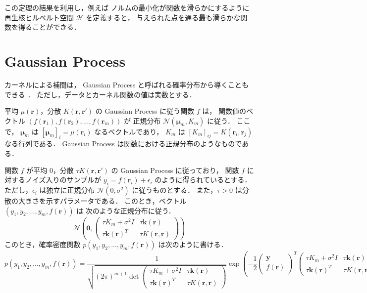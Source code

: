 この定理の結果を利用し，例えば
ノルムの最小化が関数を滑らかにするように
再生核ヒルベルト空間 $\mathcal{H}$ を定義すると，
与えられた点を通る最も滑らかな関数を得ることができる．

\section{Gaussian Process}\label{sec:regularization_kernel_gaussian-process}

カーネルによる補間は，
Gaussian Process と呼ばれる確率分布から導くこともできる
\cite{Brochu2010}．
ただし，データとカーネル関数の値は実数とする．

平均 $\mu(\bm{r})$，分散 $K(\bm{r}, \bm{r}')$ の Gaussian Process に従う関数 $f$ は，
関数値のベクトル $(f(\bm{r}_1), f(\bm{r}_2), \ldots, f(\bm{r}_m))$ が
正規分布 $\mathcal{N}(\bm{\mu}_m, K_m)$ に従う．
ここで，
$\bm{\mu}_m$ は $[\bm{\mu}_m]_i = \mu(\bm{r}_i)$ なるベクトルであり，
$K_m$ は $[K_m]_{ij} = K(\bm{r}_i, \bm{r}_j)$ なる行列である．
Gaussian Process は関数における正規分布のようなものである．

関数 $f$ が平均 $0$，分散 $\tau K(\bm{r}, \bm{r}')$ の Gaussian Process に従っており，
関数 $f$ に対するノイズ入りのサンプルが $y_i = f(\bm{r}_i) + \epsilon_i$ のように得られているとする．
ただし，$\epsilon_i$ は独立に正規分布 $\mathcal{N}(0, \sigma^2)$ に従うものとする．
また，$\tau > 0$ は分散の大きさを示すパラメータである．
このとき，ベクトル $(y_1, y_2, \ldots, y_m, f(\bm{r}))$ は
次のような正規分布に従う．
\begin{equation}
    \mathcal{N}\left(\bm{0},
    \begin{pmatrix}
        \tau K_m + \sigma^2 I & \tau \bm{k}(\bm{r})    \\
        \tau \bm{k}(\bm{r})^T & \tau K(\bm{r}, \bm{r})
    \end{pmatrix}
    \right)
\end{equation}
このとき，確率密度関数 $p(y_1, y_2, \ldots, y_m, f(\bm{r}))$ は次のように書ける．
\begin{equation}
    p(y_1, y_2, \ldots, y_m, f(\bm{r}))
    = \frac{1}{\sqrt{(2\pi)^{m+1} \det{
                \begin{pmatrix}
                    \tau K_m + \sigma^2 I & \tau \bm{k}(\bm{r})    \\
                    \tau \bm{k}(\bm{r})^T & \tau K(\bm{r}, \bm{r})
                \end{pmatrix}
            }}}
    \exp\left(-\frac{1}{2}
    \begin{pmatrix}
        \bm{y} \\ f(\bm{r})
    \end{pmatrix}^T
    \begin{pmatrix}
        \tau K_m + \sigma^2 I & \tau \bm{k}(\bm{r})    \\
        \tau \bm{k}(\bm{r})^T & \tau K(\bm{r}, \bm{r})
    \end{pmatrix}^{-1}
    \begin{pmatrix}
        \bm{y} \\ f(\bm{r})
    \end{pmatrix}
    \right)
\end{equation}

